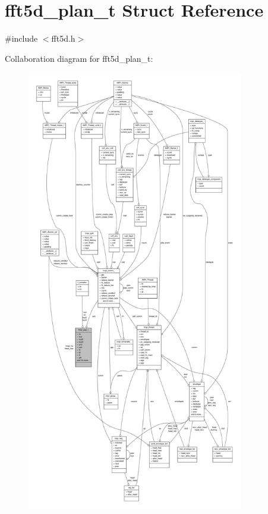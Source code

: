 \hypertarget{structfft5d__plan__t}{\section{fft5d\-\_\-plan\-\_\-t \-Struct \-Reference}
\label{structfft5d__plan__t}
}


{\ttfamily \#include $<$fft5d.\-h$>$}



\-Collaboration diagram for fft5d\-\_\-plan\-\_\-t\-:
\nopagebreak
\begin{figure}[H]
\begin{center}
\leavevmode
\includegraphics[height=550pt]{structfft5d__plan__t__coll__graph}
\end{center}
\end{figure}
